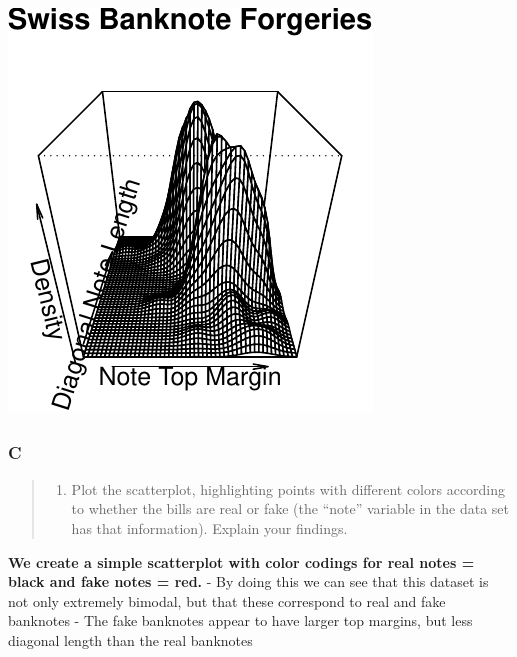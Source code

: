\documentclass[
]{article}
\providecommand{\tightlist}{%
  \setlength{\itemsep}{0pt}\setlength{\parskip}{0pt}}
\begin{document}
\begin{center}\includegraphics{2.0-Multivariate-Visualization-Assignment_files/figure-latex/unnamed-chunk-16-1} \end{center}

\hypertarget{c}{%
\subsubsection{C}\label{c}}

\begin{quote}
\begin{enumerate}
\def\labelenumi{\alph{enumi})}
\setcounter{enumi}{2}
\tightlist
\item
  Plot the scatterplot, highlighting points with different colors
  according to whether the bills are real or fake (the ``note'' variable
  in the data set has that information). Explain your findings.
\end{enumerate}
\end{quote}

\textbf{We create a simple scatterplot with color codings for real notes
= black and fake notes = red.} - By doing this we can see that this
dataset is not only extremely bimodal, but that these correspond to real
and fake banknotes - The fake banknotes appear to have larger top
margins, but less diagonal length than the real banknotes
\end{document}
